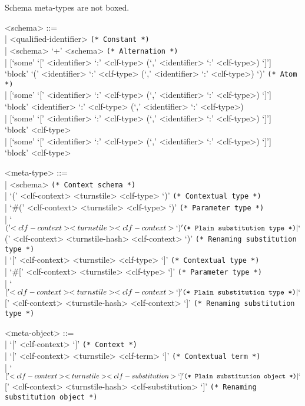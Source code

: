 \documentclass[11pt]{article}
\begin{document}
Schema meta-types are not boxed.

\begin{grammar}
<schema> ::= \hfill\\
| <qualified-identifier> \hfill \texttt{(* Constant *)}\\
| <schema> `+' <schema> \hfill \texttt{(* Alternation *)}\\
| [`some' `[' <identifier> `:' <clf-type> (`,' <identifier> `:' <clf-type>) `]']\\
  `block' `(' <identifier> `:' <clf-type> (`,' <identifier> `:' <clf-type>) `)' \hfill \texttt{(* Atom *)}\\
| [`some' `[' <identifier> `:' <clf-type> (`,' <identifier> `:' <clf-type>) `]']\\
  `block' <identifier> `:' <clf-type> (`,' <identifier> `:' <clf-type>)\\
| [`some' `[' <identifier> `:' <clf-type> (`,' <identifier> `:' <clf-type>) `]']\\
  `block' <clf-type>\\
| [`some' `[' <identifier> `:' <clf-type> (`,' <identifier> `:' <clf-type>) `]']\\
  `block' <clf-type>

<meta-type> ::= \hfill\\
| <schema> \hfill \texttt{(* Context schema *)}\\
| `(' <clf-context> <turnstile> <clf-type> `)' \hfill \texttt{(* Contextual type *)}\\
| `#(' <clf-context> <turnstile> <clf-type> `)' \hfill \texttt{(* Parameter type *)}\\
| `$(' <clf-context> <turnstile> <clf-context> `)' \hfill \texttt{(* Plain substitution type *)}\\
| `$(' <clf-context> <turnstile-hash> <clf-context> `)' \hfill \texttt{(* Renaming substitution type *)}\\
| `[' <clf-context> <turnstile> <clf-type> `]' \hfill \texttt{(* Contextual type *)}\\
| `#[' <clf-context> <turnstile> <clf-type> `]' \hfill \texttt{(* Parameter type *)}\\
| `$[' <clf-context> <turnstile> <clf-context> `]' \hfill \texttt{(* Plain substitution type *)}\\
| `$[' <clf-context> <turnstile-hash> <clf-context> `]' \hfill \texttt{(* Renaming substitution type *)}

<meta-object> ::= \hfill\\
| `[' <clf-context> `]' \hfill \texttt{(* Context *)}\\
| `[' <clf-context> <turnstile> <clf-term> `]' \hfill \texttt{(* Contextual term *)}\\
| `$[' <clf-context> <turnstile> <clf-substitution> `]' \hfill \texttt{(* Plain substitution object *)}\\
| `$[' <clf-context> <turnstile-hash> <clf-substitution> `]' \hfill \texttt{(* Renaming substitution object *)}


\end{grammar}
\end{document}
